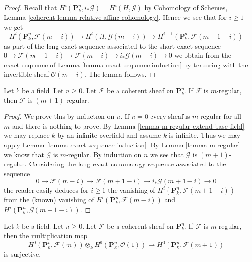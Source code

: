 \begin{proof}
Recall that $H^i(\mathbf{P}^n_k, i_*\mathcal{G}) = H^i(H, \mathcal{G})$ by
Cohomology of Schemes, Lemma \ref{coherent-lemma-relative-affine-cohomology}.
Hence we see that for $i \geq 1$ we get
$$
H^i(\mathbf{P}^n_k, \mathcal{F}(m - i)) \to
H^i(H, \mathcal{G}(m - i)) \to
H^{i + 1}(\mathbf{P}^n_k, \mathcal{F}(m - 1 - i))
$$
as part of the long exact sequence associated to the short exact sequence
$0 \to \mathcal{F}(m - 1 - i) \to \mathcal{F}(m - i)
\to i_*\mathcal{G}(m - i) \to 0$
we obtain from the exact sequence of
Lemma \ref{lemma-exact-sequence-induction} by tensoring with
the invertible sheaf $\mathcal{O}(m - i)$. The lemma follows.
\end{proof}

\begin{lemma}
\label{lemma-m-regular-up}
Let $k$ be a field. Let $n \geq 0$.
Let $\mathcal{F}$ be a coherent sheaf on $\mathbf{P}^n_k$.
If $\mathcal{F}$ is $m$-regular, then $\mathcal{F}$ is
$(m + 1)$-regular.
\end{lemma}

\begin{proof}
We prove this by induction on $n$. If $n = 0$ every sheaf is $m$-regular
for all $m$ and there is nothing to prove. By
Lemma \ref{lemma-m-regular-extend-base-field} we may replace $k$
by an infinite overfield and assume $k$ is infinite.
Thus we may apply Lemma \ref{lemma-exact-sequence-induction}.
By Lemma \ref{lemma-m-regular} we know that $\mathcal{G}$ is
$m$-regular. By induction on $n$ we see that $\mathcal{G}$ is
$(m + 1)$-regular. Considering the long exact cohomology sequence
associated to the sequence
$$
0 \to \mathcal{F}(m - i) \to \mathcal{F}(m + 1 - i)
\to i_*\mathcal{G}(m + 1 - i) \to 0
$$
the reader easily deduces for $i \geq 1$ the vanishing of
$H^i(\mathbf{P}^n_k, \mathcal{F}(m + 1 - i))$ from the (known) vanishing of
$H^i(\mathbf{P}^n_k, \mathcal{F}(m - i))$ and
$H^i(\mathbf{P}^n_k, \mathcal{G}(m + 1 - i))$.
\end{proof}

\begin{lemma}
\label{lemma-m-regular-multiply}
Let $k$ be a field. Let $n \geq 0$.
Let $\mathcal{F}$ be a coherent sheaf on $\mathbf{P}^n_k$.
If $\mathcal{F}$ is $m$-regular, then the multiplication map
$$
H^0(\mathbf{P}^n_k, \mathcal{F}(m)) \otimes_k
H^0(\mathbf{P}^n_k, \mathcal{O}(1))
\longrightarrow
H^0(\mathbf{P}^n_k, \mathcal{F}(m + 1))
$$
is surjective.
\end{lemma}

